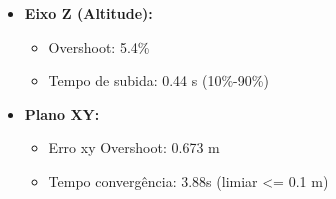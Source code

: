 \begin{itemize}
  \item \textbf{Eixo Z (Altitude):}
  \begin{itemize}
    \item Overshoot: 5.4\%
    \item Tempo de subida: 0.44 s (10\%-90\%)
  \end{itemize}
  \item \textbf{Plano XY:}
  \begin{itemize}
    \item Erro xy Overshoot: 0.673 m
    \item Tempo convergência: 3.88s (limiar <= 0.1 m)
  \end{itemize}
\end{itemize}
